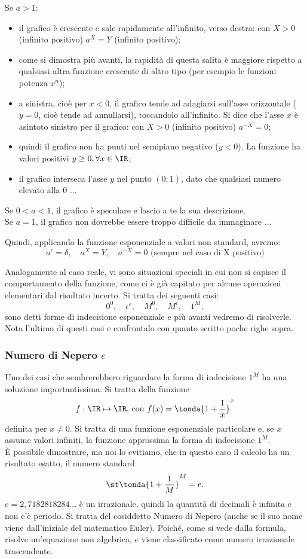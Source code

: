 Se $a>1$:
\begin{itemize} [noitemsep]
 \item 
il grafico è crescente e sale rapidamente all'infinito, verso destra: 
con $X>0$ (infinito positivo) $a^X=Y$ (infinito positivo);
 \item 
come si dimostra più avanti, la rapidità di questa salita è maggiore rispetto 
a qualsiasi altra funzione crescente di altro tipo (per esempio le funzioni 
potenza $x^n$);
 \item
a sinistra, cioè per $x<0$, il grafico tende ad adagiarsi sull'asse
orizzontale ($y=0$, cioè tende ad annullarsi), toccandolo all'infinito. Si
dice che l'asse $x$ è asintoto sinistro per il grafico: con $X>0$ (infinito
positivo) $a^{-X}=0$;
 \item
quindi il grafico non ha punti nel semipiano negativo ($y<0$). La funzione ha
valori positivi $y\ge 0, \forall x\in \IR$;
 \item
il grafico interseca l'asse $y$ nel punto $(0;1)$, dato che qualsiasi numero
elevato alla 0 ...
\end{itemize}
Se $0<a<1$, il grafico è speculare e lascio a te la sua descrizione.\\
Se $a=1$, il grafico non dovrebbe essere troppo difficile da immaginare ...

Quindi, applicando la funzione esponenziale a valori non standard, avremo: 
\[
 a^\epsilon=\delta, \quad a^X=Y,\quad a^{-X}=0 \text{ (sempre nel caso di X positivo)}
\]

\begin{osservazione}
 Analogamente al caso reale, vi sono situazioni speciali in cui non si capisce il 
 comportamento della funzione, come ci è già capitato per alcune operazioni elementari
 dal risultato incerto. Si tratta dei seguenti casi:
 \[
  0^0,\quad \epsilon^\epsilon, \quad M^0, \quad M^\epsilon, \quad 1^M,
 \]
  sono detti forme di indecisione esponenziale e più avanti vedremo di risolverle.
  Nota l'ultimo di questi casi e confrontalo con quanto scritto poche righe sopra.
\end{osservazione}

\subsubsection{Numero di Nepero $e$}
\label{subsubsec:insnum_nepero}
Uno dei casi che sembrerebbero riguardare la forma di indecisione $1^M$
ha una soluzione importantissima. Si tratta della funzione
\[
 f:\IR\mapsto \IR \text{, con } f(x)= \tonda{1+\frac{1}{x}}^x
\]
definita per $x\ne 0$. Si tratta di una funzione esponenziale particolare 
e, se $x$ assume valori infiniti, la funzione approssima la forma di indecisione
$1^M$.\\
È possibile dimostrare, ma noi lo evitiamo, che in questo caso il calcolo
ha un risultato esatto, il numero standard
\[
 \st\tonda{1+\frac{1}{M}}^M=e.
\]
$e=2,7182818284...$ è un irrazionale, quindi la quantità 
di decimali è infinita e non c'è periodo. 
Si tratta del cosiddetto Numero di Nepero (anche se il suo nome viene dall'iniziale 
del matematico Euler). Poiché, come si vede dalla formula, risolve un'equazione
non algebrica, $e$ viene classificato come numero irrazionale trascendente.

